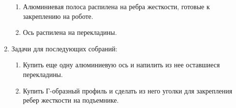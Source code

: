 \begin{enumerate}
\begin{enumerate}
      \item Алюминиевая полоса распилена на ребра жесткости, готовые к закреплению на роботе.
      
      \item Ось распилена на перекладины.
      
    \end{enumerate}
    
	\item Задачи для последующих собраний:
	\begin{enumerate}
	  \item Купить еще одну алюминиевую ось и напилить из нее оставшиеся перекладины.
	  
	  \item Купить Г-образный профиль и сделать из него уголки для закрепления ребер жесткости на подъемнике.

    \end{enumerate}     
\end{enumerate}
\fillpage
